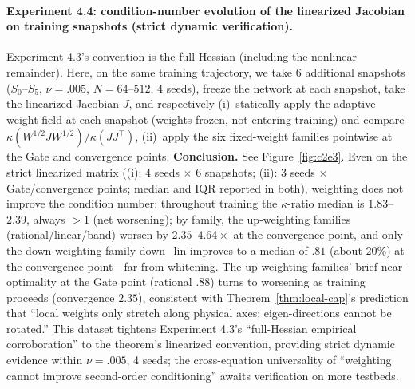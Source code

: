 \documentclass[11pt]{article}
\numberwithin{equation}{section}
\begin{document}
\paragraph{Experiment 4.4: condition-number evolution of the linearized Jacobian on training snapshots (strict dynamic verification).}
Experiment 4.3's convention is the full Hessian (including the nonlinear remainder). Here, on the same training trajectory, we take 6 additional snapshots ($S_0$--$S_5$, $\nu=.005$, $N=64$--$512$, 4 seeds), freeze the network at each snapshot, take the linearized Jacobian $J$, and respectively (i)~statically apply the adaptive weight field at each snapshot (weights frozen, not entering training) and compare $\kappa(W^{1/2}JW^{1/2})/\kappa(JJ^\top)$, (ii)~apply the six fixed-weight families pointwise at the Gate and convergence points.
\noindent\textbf{Conclusion.} See Figure~\ref{fig:c2e3}. Even on the strict linearized matrix ((i): 4 seeds $\times$ 6 snapshots; (ii): 3 seeds $\times$ Gate/convergence points; median and IQR reported in both), weighting does not improve the condition number: throughout training the $\kappa$-ratio median is $1.83$--$2.39$, always $>1$ (net worsening); by family, the up-weighting families (rational/linear/band) worsen by $2.35$--$4.64\times$ at the convergence point, and only the down-weighting family down\_lin improves to a median of $.81$ (about $20\%$) at the convergence point---far from whitening. The up-weighting families' brief near-optimality at the Gate point (rational $.88$) turns to worsening as training proceeds (convergence $2.35$), consistent with Theorem~\ref{thm:local-cap}'s prediction that ``local weights only stretch along physical axes; eigen-directions cannot be rotated.'' This dataset tightens Experiment 4.3's ``full-Hessian empirical corroboration'' to the theorem's linearized convention, providing strict dynamic evidence within $\nu=.005$, 4 seeds; the cross-equation universality of ``weighting cannot improve second-order conditioning'' awaits verification on more testbeds.
\end{document}
